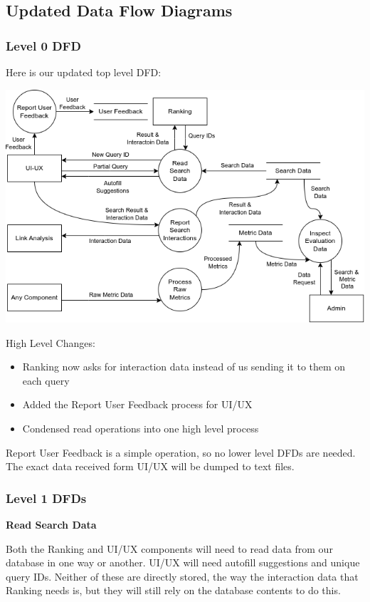 \subsection*{Updated Data Flow Diagrams}

\subsubsection*{Level 0 DFD}

Here is our updated top level DFD:

\begin{center}
  \includegraphics[scale=0.5]{DFDs/HighLevelDFD.drawio (1).png}
\end{center}
High Level Changes:
\begin{itemize}
  \item Ranking now asks for interaction data instead of us sending it to them on each query
  \item Added the Report User Feedback process for UI/UX
  \item Condensed read operations into one high level process
\end{itemize}

Report User Feedback is a simple operation, so no lower level DFDs are needed. The exact data received form UI/UX will be dumped to text files.

\subsubsection*{Level 1 DFDs}

\textbf{Read Search Data}

\medskip

Both the Ranking and UI/UX components will need to read data from our database in one way or another. UI/UX will need autofill suggestions and unique query IDs. Neither of these are directly stored, the way the interaction data that Ranking needs is, but they will still rely on the database contents to do this.

